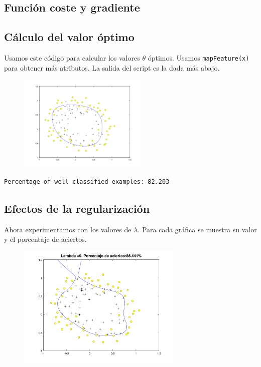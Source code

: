 \documentclass{article}
\begin{document}
\subsection{Función coste y gradiente}


\subsection{Cálculo del valor óptimo}
Usamos este código para calcular los valores $\theta$ óptimos. Usamos {\tt mapFeature(x)} para obtener más atributos. La salida del script es la dada más abajo.


\begin{figure}[h]
\centering
\includegraphics[width=0.55\textwidth]{regresion2}
\label{fig:estudio}
\end{figure}

\begin{lstlisting}[style=snippet]
Percentage of well classified examples: 82.203
\end{lstlisting}

\subsection{Efectos de la regularización}
Ahora experimentamos con los valores de $\lambda$. Para cada gráfica se muestra su valor y el porcentaje de aciertos.

\begin{figure}[h]
\centering
\includegraphics[width=0.7\textwidth]{estudio0}
\label{fig:estudio}
\end{figure}
\end{document}
